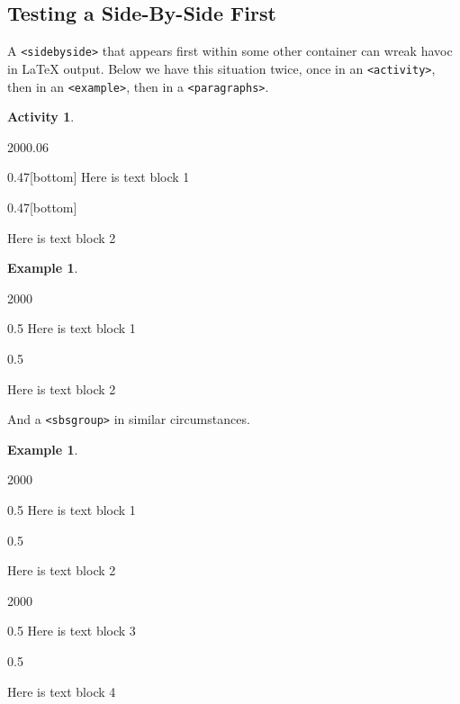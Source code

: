 \documentclass{amsart}
\theoremstyle{plain}%
\theoremstyle{definition}%
\newtheorem{activity}[theorem]{Activity}
\newtheorem{example}[theorem]{Example}
\theoremstyle{remark}%
\newcommand{\mono}[1]{\texttt{#1}}
\numberwithin{equation}{section}
\begin{document}
\subsection{Testing a Side-By-Side First}\label{section-side-by-side-18}%
A \mono{<sidebyside>} that appears first within some other container can wreak havoc in \LaTeX{} output.  Below we have this situation twice, once in an \mono{<activity>}, then in an \mono{<example>}, then in a \mono{<paragraphs>}.%
\begin{activity}\label{section-side-by-side-18-3}%
%
\begin{sidebyside}{2}{0}{0}{0.06}%
\begin{sbspanel}{0.47}[bottom]%
Here is text block 1%
\end{sbspanel}%
\begin{sbspanel}{0.47}[bottom]%
\par
Here is text block 2%
\end{sbspanel}%
\end{sidebyside}%
\end{activity}%
\begin{example}\label{section-side-by-side-18-4}%
%
\begin{sidebyside}{2}{0}{0}{0}%
\begin{sbspanel}{0.5}%
Here is text block 1%
\end{sbspanel}%
\begin{sbspanel}{0.5}%
\par
Here is text block 2%
\end{sbspanel}%
\end{sidebyside}%
\end{example}
And a \mono{<sbsgroup>} in similar circumstances.%
\begin{example}\label{section-side-by-side-18-6}%
%
\begin{sidebyside}{2}{0}{0}{0}%
\begin{sbspanel}{0.5}%
Here is text block 1%
\end{sbspanel}%
\begin{sbspanel}{0.5}%
\par
Here is text block 2%
\end{sbspanel}%
\end{sidebyside}%
\begin{sidebyside}{2}{0}{0}{0}%
\begin{sbspanel}{0.5}%
Here is text block 3%
\end{sbspanel}%
\begin{sbspanel}{0.5}%
\par
Here is text block 4%
\end{sbspanel}%
\end{sidebyside}%
\end{example}
\end{document}
